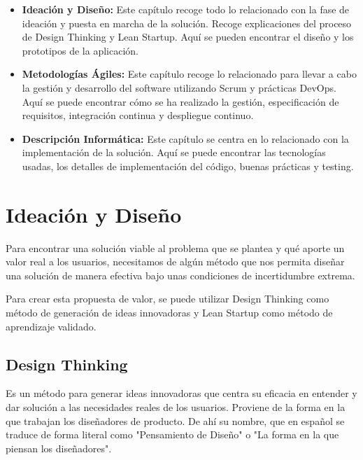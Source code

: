 \documentclass[12pt,twoside,titlepage]{report}
\newcommand\blankpage{%
    \newpage
    \null
    \thispagestyle{empty}%
    \newpage}
\begin{document}
\begin{itemize}
    \item \textbf{Ideación y Diseño:} Este capítulo recoge todo lo relacionado con la fase de ideación y puesta en marcha de la solución. Recoge explicaciones del proceso de Design Thinking y Lean Startup. Aquí se pueden encontrar el diseño y los prototipos de la aplicación.
    \item \textbf{Metodologías Ágiles:} Este capítulo recoge lo relacionado para llevar a cabo la gestión y desarrollo del software utilizando Scrum y prácticas DevOps. Aquí se puede encontrar cómo se ha realizado la gestión, especificación de requisitos, integración continua y despliegue continuo.
    \item \textbf{Descripción Informática:} Este capítulo se centra en lo relacionado con la implementación de la solución. Aquí se puede encontrar las tecnologías usadas, los detalles de implementación del código, buenas prácticas y testing.
\end{itemize}





\chapter{Ideación y Diseño}

Para encontrar una solución viable al problema que se plantea y qué aporte un valor real a los usuarios, necesitamos de algún método que nos permita diseñar una solución de manera efectiva bajo unas condiciones de incertidumbre extrema.

Para crear esta propuesta de valor, se puede utilizar Design Thinking como método de generación de ideas innovadoras y Lean Startup como método de aprendizaje validado.

\section{Design Thinking}

Es un método para generar ideas innovadoras que centra su eficacia en entender y dar solución a las necesidades reales de los usuarios. Proviene de la forma en la que trabajan los diseñadores de producto. De ahí su nombre, que en español se traduce de forma literal como "Pensamiento de Diseño" o "La forma en la que piensan los diseñadores".
\end{document}
